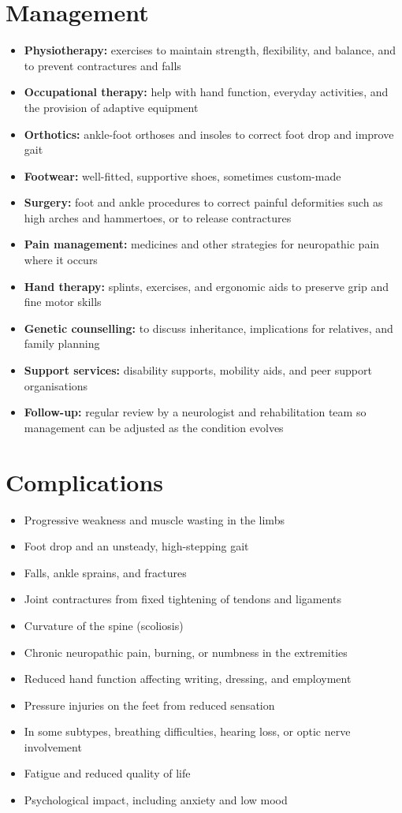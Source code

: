 \section*{Management}
\begin{itemize}
    \item \textbf{Physiotherapy:} exercises to maintain strength, flexibility, and balance, and to prevent contractures and falls
    \item \textbf{Occupational therapy:} help with hand function, everyday activities, and the provision of adaptive equipment
    \item \textbf{Orthotics:} ankle-foot orthoses and insoles to correct foot drop and improve gait
    \item \textbf{Footwear:} well-fitted, supportive shoes, sometimes custom-made
    \item \textbf{Surgery:} foot and ankle procedures to correct painful deformities such as high arches and hammertoes, or to release contractures
    \item \textbf{Pain management:} medicines and other strategies for neuropathic pain where it occurs
    \item \textbf{Hand therapy:} splints, exercises, and ergonomic aids to preserve grip and fine motor skills
    \item \textbf{Genetic counselling:} to discuss inheritance, implications for relatives, and family planning
    \item \textbf{Support services:} disability supports, mobility aids, and peer support organisations
    \item \textbf{Follow-up:} regular review by a neurologist and rehabilitation team so management can be adjusted as the condition evolves
\end{itemize}

\section*{Complications}
\begin{itemize}
    \item Progressive weakness and muscle wasting in the limbs
    \item Foot drop and an unsteady, high-stepping gait
    \item Falls, ankle sprains, and fractures
    \item Joint contractures from fixed tightening of tendons and ligaments
    \item Curvature of the spine (scoliosis)
    \item Chronic neuropathic pain, burning, or numbness in the extremities
    \item Reduced hand function affecting writing, dressing, and employment
    \item Pressure injuries on the feet from reduced sensation
    \item In some subtypes, breathing difficulties, hearing loss, or optic nerve involvement
    \item Fatigue and reduced quality of life
    \item Psychological impact, including anxiety and low mood
\end{itemize}

